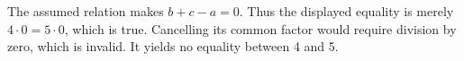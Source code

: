 The assumed relation makes $b+c-a=0$. Thus the displayed equality is merely $4\cdot0=5\cdot0$, which is true. Cancelling its common factor would require division by zero, which is invalid. It yields no equality between 4 and 5.
